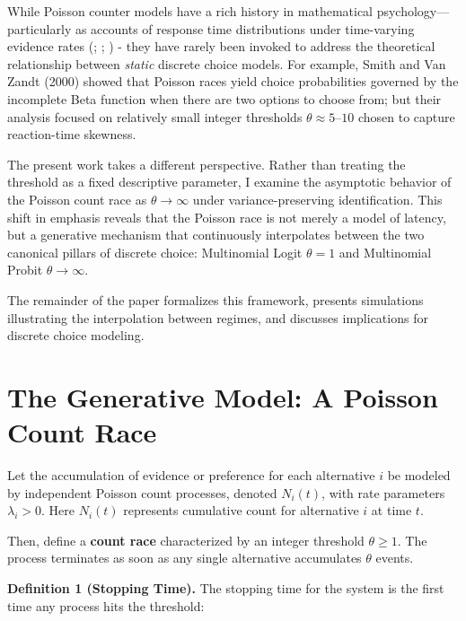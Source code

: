\documentclass[
  man,
  floatsintext,
  longtable,
  a4paper,
  nolmodern,
  notxfonts,
  notimes,
  colorlinks=true,linkcolor=blue,citecolor=blue,urlcolor=blue]{apa7}
\begin{document}
While Poisson counter models have a rich history in mathematical
psychology---particularly as accounts of response time distributions
under time-varying evidence rates
(;
; ) - they have rarely been invoked to address the
theoretical relationship between \emph{static} discrete choice models.
For example, Smith and Van Zandt (2000) showed that Poisson races yield
choice probabilities governed by the incomplete Beta function when there
are two options to choose from; but their analysis focused on relatively
small integer thresholds \(\theta \approx 5\text{–}10\) chosen to
capture reaction-time skewness.

The present work takes a different perspective. Rather than treating the
threshold as a fixed descriptive parameter, I examine the asymptotic
behavior of the Poisson count race as \(\theta \to \infty\) under
variance-preserving identification. This shift in emphasis reveals that
the Poisson race is not merely a model of latency, but a generative
mechanism that continuously interpolates between the two canonical
pillars of discrete choice: Multinomial Logit \(\theta = 1\) and
Multinomial Probit \(\theta \to \infty\).

The remainder of the paper formalizes this framework, presents
simulations illustrating the interpolation between regimes, and
discusses implications for discrete choice modeling.

\section{The Generative Model: A Poisson Count
Race}\label{the-generative-model-a-poisson-count-race}

Let the accumulation of evidence or preference for each alternative
\(i\) be modeled by independent Poisson count processes, denoted
\(N_i(t)\), with rate parameters \(\lambda_i > 0\). Here \(N_i(t)\)
represents cumulative count for alternative \(i\) at time \(t\).

Then, define a \textbf{count race} characterized by an integer threshold
\(\theta \ge 1\). The process terminates as soon as any single
alternative accumulates \(\theta\) events.

\textbf{Definition 1 (Stopping Time).} The stopping time for the system
is the first time any process hits the threshold:
\end{document}
